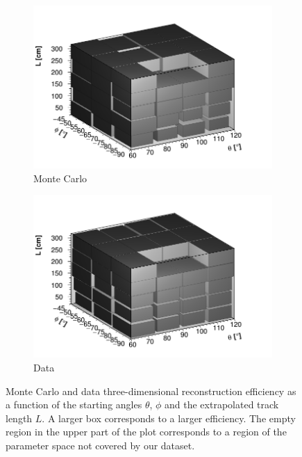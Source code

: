 \documentclass[a4paper]{scrartcl}
\begin{document}
\begin{figure}[htbp]
  \begin{subfigure}{0.52\textwidth}
    \includegraphics[width=\linewidth]{figures/3d_mc.png}
    \caption{Monte Carlo} \label{fig:3d_mc}
  \end{subfigure}
  \begin{subfigure}{0.52\textwidth}
    \includegraphics[width=\linewidth]{figures/3d_data.png}
    \caption{Data} \label{fig:3d_data}
  \end{subfigure}
  \caption{Monte Carlo and data three-dimensional reconstruction efficiency as a function of the starting angles $\theta$, $\phi$ and the extrapolated track length $L$. A larger box corresponds to a larger efficiency. The empty region in the upper part of the plot corresponds to a region of the parameter space not covered by our dataset.}\label{fig:3d}
\end{figure}
\end{document}
